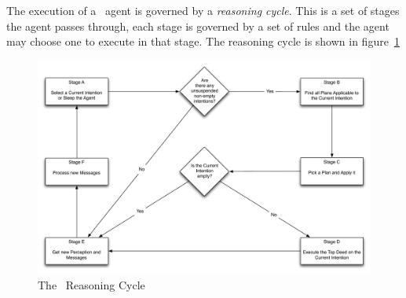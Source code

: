 The execution of a \gwendolen\ agent is governed by a \emph{reasoning cycle}.  This is a set of stages the agent passes through, each stage is governed by a set of rules and the agent may choose one to execute in that stage.  The reasoning cycle is shown in figure~\ref{fig:reasoning_cycle}
\begin{figure}
\includegraphics[width=\textwidth]{images/ReasoningCycle.pdf}
\caption{The \gwendolen\ Reasoning Cycle}
\label{fig:reasoning_cycle}
\end{figure}
